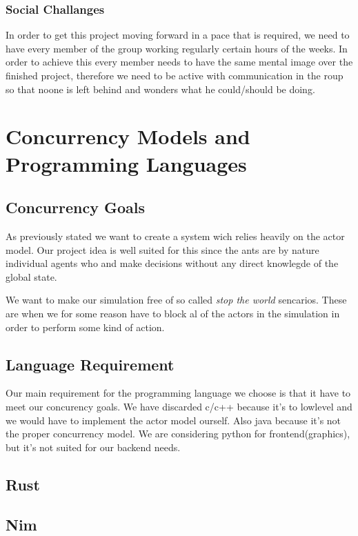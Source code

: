 \documentclass[a4paper]{article}
\begin{document}
\subsubsection{Social Challanges}
In order to get this project moving forward in a pace that is required, we need
to have every member of the group working regularly certain hours of the weeks.
In order to achieve this every member needs to have the same mental image over
the finished project, therefore we need to be active with communication in the
roup so that noone is left behind and wonders what he could/should be doing.

\section{Concurrency Models and Programming Languages}

\subsection{Concurrency Goals}
As previously stated we want to create a system wich relies heavily on the actor
model. Our project idea is well suited for this since the ants are by nature
individual agents who and make decisions without any direct knowlegde of the
global state.

We want to make our simulation free of so called \emph{stop the world}
sencarios. These are when we for some reason have to block al of the actors in
the simulation in order to perform some kind of action.

\subsection{Language Requirement}
Our main requirement for the programming language we choose is that it have to meet our concurency goals.
We have discarded c/c++ because it's to lowlevel and we would have to implement the actor model ourself. 
Also java because it's not the proper concurrency model. We are considering python for frontend(graphics),
but it's not suited for our backend needs.

\subsection{Rust}

\subsection{Nim}
\end{document}
